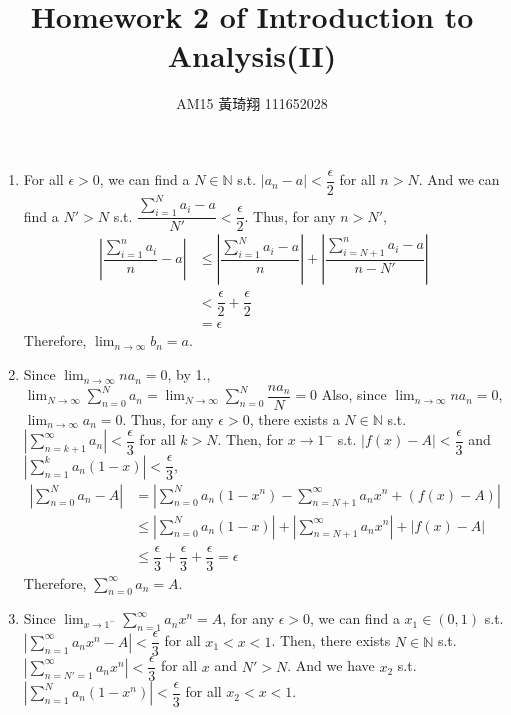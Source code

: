 \documentclass[12pt]{article}
\title{Homework 2 of Introduction to Analysis(II)}
\author{AM15 黃琦翔 111652028}
\begin{document}
\maketitle
\begin{enumerate}
    \item For all $\epsilon > 0$, we can find a $N \in \mathbb{N}$ s.t. $|a_n - a| < \dfrac{\epsilon}{2}$ for all $n > N$.
    And we can find a $N' > N$ s.t. $\dfrac{\displaystyle\sum_{i=1}^{N} a_i - a}{N'} < \dfrac{\epsilon}{2}$.
    Thus, for any $n > N'$, \begin{align*}
        |\dfrac{\sum_{i=1}^{n} a_i }{n} - a| &\leq |\dfrac{\sum_{i=1}^{N} a_i - a}{n}| + |\dfrac{\sum_{i=N+1}^{n} a_i - a}{n - N'}|\\
        &< \dfrac{\epsilon}{2} + \dfrac{\epsilon}{2}\\
        &= \epsilon
    \end{align*}
    Therefore, $\displaystyle\lim_{n\to\infty} b_n = a$.

    \item Since $\displaystyle\lim_{n\to\infty} na_n = 0$, by 1., $\displaystyle\lim_{N\to\infty} \displaystyle\sum_{n=0}^{N} a_n = \displaystyle\lim_{N\to\infty} \displaystyle\sum_{n=0}^{N} \dfrac{na_n}{N} = 0$
    Also, since $\displaystyle\lim_{n\to\infty} na_n = 0$, $\displaystyle\lim_{n\to\infty} a_n = 0$.
    Thus, for any $\epsilon > 0$,  there exists a $N \in \mathbb{N}$ s.t. $|\displaystyle\sum_{n=k+1}^{\infty} a_n| < \dfrac{\epsilon}{3}$ for all $k > N$.
    Then, for $x \to 1^{-}$ s.t. $|f(x) - A| < \dfrac{\epsilon}{3}$ and $|\displaystyle\sum_{n=1}^{k} a_n(1-x)| < \dfrac{\epsilon}{3}$, \begin{align*}
        |\sum_{n=0}^{N} a_n - A| &= |\sum_{n=0}^{N} a_n(1-x^n) - \sum_{n=N+1}^{\infty} a_n x^n + (f(x) - A)|\\
        &\leq |\sum_{n=0}^{N} a_n(1-x)| + |\sum_{n=N+1}^{\infty} a_n x^n| + |f(x) - A|\\
        &\leq \dfrac{\epsilon}{3} + \dfrac{\epsilon}{3} + \dfrac{\epsilon}{3} = \epsilon
    \end{align*}
    Therefore, $\displaystyle\sum_{n=0}^{\infty} a_n = A$.

    \newpage
    \item Since $\displaystyle\lim_{x\to 1^-} \displaystyle\sum_{n=1}^{\infty} a_nx^n = A$,
    for any $\epsilon > 0$, we can find a $x_1 \in (0, 1)$ s.t. $|\displaystyle\sum_{n=1}^{\infty} a_nx^n - A| < \dfrac{\epsilon}{3}$ for all $x_1 < x < 1$.
    Then, there exists $N\in\mathbb{N}$ s.t. $|\sum_{n=N'=1}^{\infty} a_n x^n| < \dfrac{\epsilon}{3}$ for all $x$ and $N' > N$.
    And we have $x_2$ s.t. $|\displaystyle\sum_{n=1}^{N} a_n(1-x^n)| < \dfrac{\epsilon}{3}$ for all $x_2 < x < 1$.


\end{enumerate}
\end{document}
